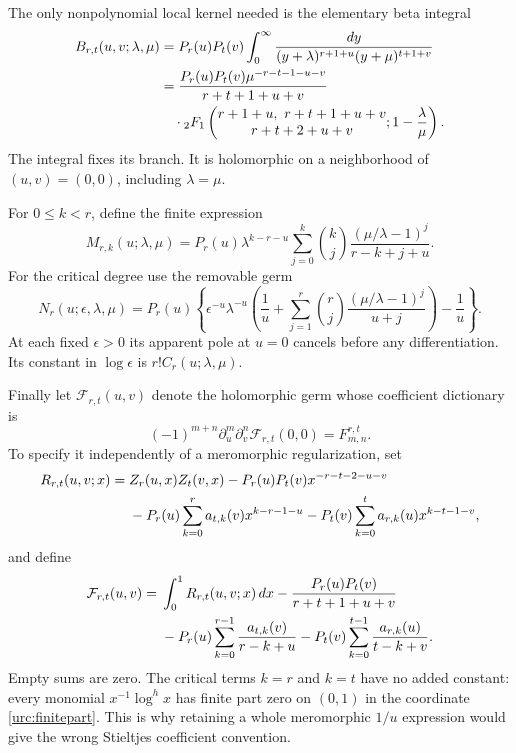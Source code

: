\documentclass[11pt,a4paper]{article}
\theoremstyle{definition}
\theoremstyle{remark}
\numberwithin{equation}{section}
\begin{document}
The only nonpolynomial local kernel needed is the elementary beta
integral
\begin{align}
 B_{r,t}(u,v;\lambda,\mu)
 &=P_r(u)P_t(v)\int_0^\infty
 \frac{dy}{(y+\lambda)^{r+1+u}(y+\mu)^{t+1+v}}\notag\\
 &=\frac{P_r(u)P_t(v)\mu^{-r-t-1-u-v}}{r+t+1+u+v}\notag\\
 &\quad\cdot{}_2F_1\left(
 \begin{matrix}r+1+u,\ r+t+1+u+v\\r+t+2+u+v\end{matrix};
                   1-\frac\lambda\mu\right).
 \label{urc:beta-kernel}
\end{align}
The integral fixes its branch. It is holomorphic on a neighborhood
of $(u,v)=(0,0)$, including $\lambda=\mu$.

For $0\le k<r$, define the finite expression
\begin{equation}\label{urc:mixed-kernel}
 M_{r,k}(u;\lambda,\mu)
 =P_r(u)\lambda^{k-r-u}
  \sum_{j=0}^k\binom kj
      \frac{(\mu/\lambda-1)^j}{r-k+j+u}.
\end{equation}
For the critical degree use the removable germ
\begin{equation}\label{urc:critical-kernel}
 N_r(u;\epsilon,\lambda,\mu)
 =P_r(u)\left\{
 \epsilon^{-u}\lambda^{-u}
 \left(\frac1u+\sum_{j=1}^r\binom rj
                  \frac{(\mu/\lambda-1)^j}{u+j}\right)
 -\frac1u\right\}.
\end{equation}
At each fixed $\epsilon>0$ its apparent pole at $u=0$ cancels
before any differentiation. Its constant in $\log\epsilon$ is
$r!C_r(u;\lambda,\mu)$.

Finally let $\mathcal F_{r,t}(u,v)$ denote the holomorphic germ whose
coefficient dictionary is
\begin{equation}\label{urc:fp-germ}
 (-1)^{m+n}\partial_u^m\partial_v^n
          \mathcal F_{r,t}(0,0)=F_{m,n}^{r,t}.
\end{equation}
To specify it independently of a meromorphic regularization, set
\begin{align}
 R_{r,t}(u,v;x)={}&Z_r(u,x)Z_t(v,x)
 -P_r(u)P_t(v)x^{-r-t-2-u-v}\notag\\
 &-P_r(u)\sum_{k=0}^r a_{t,k}(v)x^{k-r-1-u}
 -P_t(v)\sum_{k=0}^t a_{r,k}(u)x^{k-t-1-v},
 \label{urc:remainder}
\end{align}
and define
\begin{align}
 \mathcal F_{r,t}(u,v)={}&\int_0^1R_{r,t}(u,v;x)\,dx
 -\frac{P_r(u)P_t(v)}{r+t+1+u+v}\notag\\
 &-P_r(u)\sum_{k=0}^{r-1}\frac{a_{t,k}(v)}{r-k+u}
 -P_t(v)\sum_{k=0}^{t-1}\frac{a_{r,k}(u)}{t-k+v}.
 \label{urc:fp-germ-construction}
\end{align}
Empty sums are zero. The critical terms $k=r$ and $k=t$ have no
added constant: every monomial $x^{-1}\log^h x$ has finite part
zero on $(0,1)$ in the coordinate \eqref{urc:finitepart}. This is
why retaining a whole meromorphic $1/u$ expression would give the
wrong Stieltjes coefficient convention.
\end{document}
